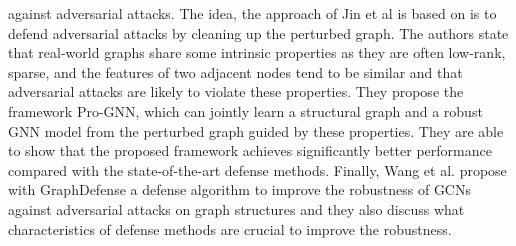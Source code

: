 \documentclass[a4paper,preprint]{sig-alternate}
\begin{document}
against adversarial attacks.\newline
The idea, the approach of Jin et al \cite{jin2020graph} is based on is to defend adversarial attacks by cleaning up the perturbed graph.
The authors state that real-world graphs share some intrinsic properties as they are often low-rank, sparse, and the features of two adjacent
nodes tend to be similar and that adversarial attacks are likely to violate these properties.\newline
They propose the framework Pro-GNN, which can jointly learn a structural graph and a robust GNN model from the perturbed graph guided by
these properties. They are able to show that the proposed framework achieves significantly better performance compared with the state-of-the-art 
defense methods.\newline
Finally, Wang et al. \cite{wang2019graphdefense} propose with GraphDefense a defense algorithm to improve the robustness of GCNs
against adversarial attacks on graph structures and they also discuss what characteristics of defense methods are crucial to improve 
the robustness.\newline
\end{document}
